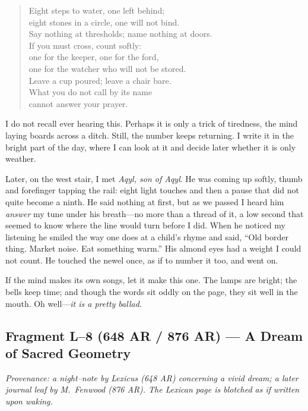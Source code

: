 \documentclass[11pt]{article}
\numberwithin{equation}{section} %
\theoremstyle{plain} %
\theoremstyle{definition} %
\theoremstyle{remark} %
\begin{document}
\begin{verse}
Eight steps to water, one left behind;\\
eight stones in a circle, one will not bind.\\
Say nothing at thresholds; name nothing at doors.\\
If you must cross, count softly:\\
one for the keeper, one for the ford,\\
one for the watcher who will not be stored.\\
Leave a cup poured; leave a chair bare.\\
What you do not call by its name\\
cannot answer your prayer.
\end{verse}

I do not recall ever hearing this. Perhaps it is only a trick of tiredness, the mind laying boards across a ditch. Still, the number keeps returning. I write it in the bright part of the day, where I can look at it and decide later whether it is only weather.

Later, on the west stair, I met \textit{Aqyl, son of Aqyl}. He was coming up softly, thumb and forefinger tapping the rail: eight light touches and then a pause that did not quite become a ninth. He said nothing at first, but as we passed I heard him \emph{answer} my tune under his breath—no more than a thread of it, a low second that seemed to know where the line would turn before I did. When he noticed my listening he smiled the way one does at a child’s rhyme and said, “Old border thing. Market noise. Eat something warm.” His almond eyes had a weight I could not count. He touched the newel once, as if to number it too, and went on.

If the mind makes its own songs, let it make this one. The lamps are bright; the bells keep time; and though the words sit oddly on the page, they sit well in the mouth. Oh well—\emph{it is a pretty ballad}.

\subsection{Fragment L--8 (648 AR / 876 AR) — A Dream of Sacred Geometry}
\label{frag:l8}

\noindent\textit{Provenance: a night–note by Lexicus (648 AR) concerning a vivid dream; a later journal leaf by M.\ Fenwood (876 AR). The Lexican page is blotched as if written upon waking.}
\end{document}
